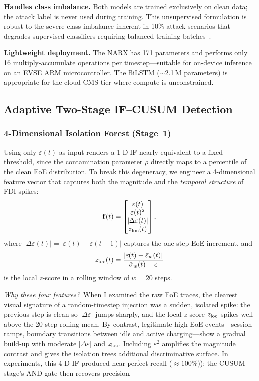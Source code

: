 \documentclass[journal]{IEEEtran}
\begin{document}
\textbf{Handles class imbalance.}
Both models are trained exclusively on clean data; the attack
label is never used during training.
This unsupervised formulation is robust to the severe class
imbalance inherent in 10\% attack scenarios that degrades
supervised classifiers requiring balanced training
batches~\cite{sakhnini2019}.

\textbf{Lightweight deployment.}
The NARX has 171 parameters and performs only 16 multiply-accumulate
operations per timestep---suitable for on-device inference on an
EVSE ARM microcontroller.
The BiLSTM ($\sim$2.1\,M parameters) is appropriate for the cloud
CMS tier where compute is unconstrained.

\subsection{Adaptive Two-Stage IF--CUSUM Detection}
\label{sec:detector}

\subsubsection{4-Dimensional Isolation Forest (Stage~1)}

Using only $\varepsilon(t)$ as input renders a 1-D IF nearly
equivalent to a fixed threshold, since the contamination parameter
$\rho$ directly maps to a percentile of the clean EoE distribution.
To break this degeneracy, we engineer a 4-dimensional feature
vector that captures both the magnitude and the \emph{temporal
structure} of FDI spikes:
\begin{equation}
  \mathbf{f}(t) =
  \begin{bmatrix}
    \varepsilon(t) \\
    \varepsilon(t)^2 \\
    |\Delta\varepsilon(t)| \\
    z_{\rm loc}(t)
  \end{bmatrix},
  \label{eq:feats}
\end{equation}
where $|\Delta\varepsilon(t)| = |\varepsilon(t)-\varepsilon(t{-}1)|$
captures the one-step EoE increment, and
\begin{equation}
  z_{\rm loc}(t) =
  \frac{|\varepsilon(t) - \bar{\varepsilon}_w(t)|}
       {\hat{\sigma}_w(t) + \epsilon}
  \label{eq:zscore}
\end{equation}
is the local $z$-score in a rolling window of $w=20$ steps.

\textit{Why these four features?}\ When I examined the raw EoE
traces, the clearest visual signature of a random-timestep injection
was a sudden, isolated spike: the previous step is clean so
$|\Delta\varepsilon|$ jumps sharply, and the local $z$-score
$z_{\rm loc}$ spikes well above the 20-step rolling mean.
By contrast, legitimate high-EoE events---session ramps,
boundary transitions between idle and active charging---show a
gradual build-up with moderate $|\Delta\varepsilon|$ and
$z_{\rm loc}$.
Including $\varepsilon^2$ amplifies the magnitude contrast and
gives the isolation trees additional discriminative surface.
In experiments, this 4-D IF produced near-perfect recall
($\approx100\%$)); the CUSUM stage's AND gate then recovers
precision.
\end{document}
